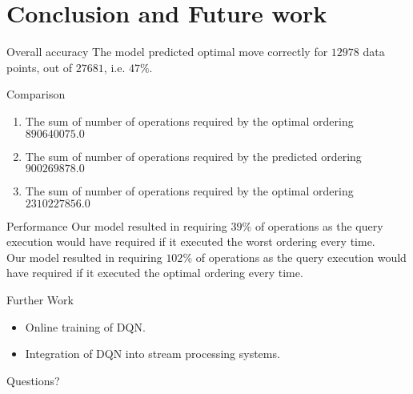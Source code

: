 \section{Conclusion and Future work}
\frame{\sectionpage}

\begin{frame}{Overall accuracy}
    The model predicted optimal move correctly for $12978$ data points, out of $27681$, i.e. $47\%$.\\
\end{frame}

\begin{frame}{Comparison}
    \begin{enumerate}
        \item The sum of number of operations required by the optimal ordering  $890640075.0$
        \item The sum of number of operations required by the predicted ordering $900269878.0$
        \item The sum of number of operations required by the optimal ordering $2310227856.0$
    \end{enumerate}
\end{frame}

\begin{frame}{Performance}
    Our model resulted in requiring $39\%$ of operations as the query execution would have required if it executed the worst ordering every time.\\
    Our model resulted in requiring $102\%$ of operations as the query execution would have required if it executed the optimal ordering every time.\\
\end{frame}

\begin{frame}{Further Work}
    \begin{itemize}
        \item Online training of DQN.
        \item Integration of DQN into stream processing systems.
    \end{itemize}
\end{frame}

\begin{frame}{}
    \begin{center}
        Questions?
    \end{center}
\end{frame}
